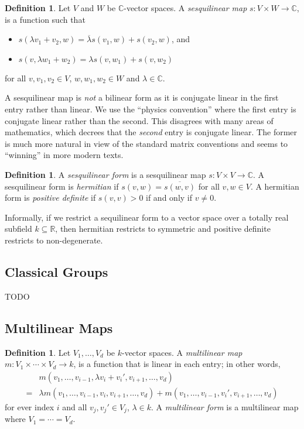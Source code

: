 \documentclass[12pt]{article}
\theoremstyle{plain}
\theoremstyle{definition}
\newtheorem{definition}[theorem]{Definition}
\theoremstyle{remark}
\numberwithin{equation}{section}
\begin{document}
\begin{definition}
Let $V$ and $W$ be $\mathbb{C}$-vector spaces.
A \emph{sesquilinear map} $s: V \times W \to \mathbb{C}$,
is a function such that
\begin{itemize}
\item $s(\lambda v_1+v_2,w) = \overline{\lambda} s(v_1,w) + s(v_2,w)$, and
\item $s(v,\lambda w_1+w_2) = \lambda s(v,w_1) + s(v,w_2)$
\end{itemize}
for all $v,v_1,v_2 \in V$, $w,w_1,w_2 \in W$ and $\lambda \in \mathbb{C}$.
\end{definition}

A sesquilinear map is \emph{not} a bilinear form as it is conjugate
linear in the first entry rather than linear.
We use the ``physics convention'' where the first entry is conjugate
linear rather than the second.  This disagrees with many areas of
mathematics, which decrees that the \emph{second} entry is conjugate linear.
The former is much more natural in view of the standard matrix
conventions and seems to ``winning'' in more modern texts.

\begin{definition}
A \emph{sesquilinear form} is a sesquilinear map $s: V \times V \to
\mathbb{C}$.
A sesquilinear form is \emph{hermitian} if $s(v,w)=\overline{s(w,v)}$
for all $v,w \in V$.
A hermitian form is \emph{positive definite} if $s(v,v) > 0$ if and only
if $v \ne 0$.
\end{definition}

Informally, if we restrict a sequilinear form to a vector space over a totally real
subfield $k \subseteq \mathbb{R}$, then hermitian restricts to symmetric
and positive definite restricts to non-degenerate.

\subsection{Classical Groups}

TODO

\subsection{Multilinear Maps}

\begin{definition}
Let $V_1,\ldots, V_d$ be $k$-vector spaces.
A \emph{multilinear map} $m: V_1 \times \cdots \times V_d \to k$,
is a function that is linear in each entry; in other words,
\begin{align*}
&m(v_1,\ldots,v_{i-1},\lambda v_i + v_i',v_{i+1},\ldots,v_d)\\
=& \lambda m(v_1,\ldots,v_{i-1},v_i,v_{i+1},\ldots,v_d)
+ m(v_1,\ldots,v_{i-1},v_i',v_{i+1},\ldots,v_d)
\end{align*}
for ever index $i$ and all $v_j,v_j' \in V_j$, $\lambda \in k$.
A \emph{multilinear form} is a multilinear map where $V_1 = \cdots = V_d$.
\end{definition}
\end{document}
